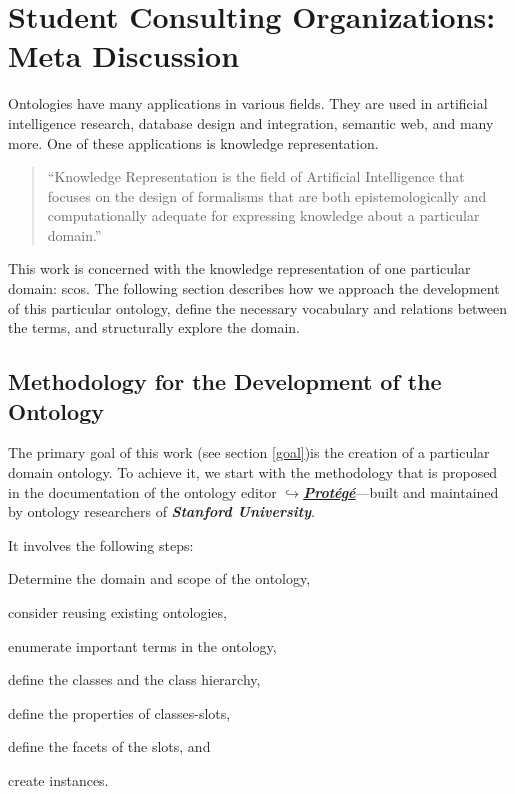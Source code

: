 \documentclass[a4paper, DIV=13, BCOR=0cm]{scrbook}
\newcommand{\pn}[1]{\textit{\textbf{#1}}}
\newcommand{\link}[2]{\href{#1}{$\hookrightarrow$#2}}
\begin{document}
\chapter{Student Consulting Organizations: Meta Discussion }
Ontologies have many applications in various fields. They are used in artificial intelligence research, database design and integration, semantic web, and many more. \cite[p.\,1]{Gomez-Perez:2004aa} One of these applications is knowledge representation.

\begin{quote}
	\enquote{Knowledge Representation is the field of Artificial Intelligence that focuses on the design of formalisms that are both epistemologically and computationally adequate for expressing knowledge about a particular domain.} \cite[p.\,XV, Preface]{baader2017introduction}
\end{quote}

This work is concerned with the knowledge representation of one particular domain: \glspl{sco}. The following section describes how we approach the development of this particular ontology, define the necessary vocabulary and relations between the terms, and structurally explore the domain.

\section{Methodology for the Development of the Ontology }

The primary goal of this work (see section \ref{goal})is the creation of a particular domain ontology. To achieve it, we start with the methodology that is proposed in the documentation \cite{guide-to-ontology} of the ontology editor \link{https://protege.stanford.edu}{\pn{Protégé}}---built and maintained by ontology researchers of \pn{Stanford University}. \cite{musen2015protege}

It involves the following steps:
\begin{compactenum}[(1)]
	\item Determine the domain and scope of the ontology,
	\item consider reusing existing ontologies,
	\item enumerate important terms in the ontology,
	\item define the classes and the class hierarchy,
	\item define the properties of classes-slots,
	\item define the facets of the slots, and
	\item create instances.
\end{compactenum}
\end{document}
